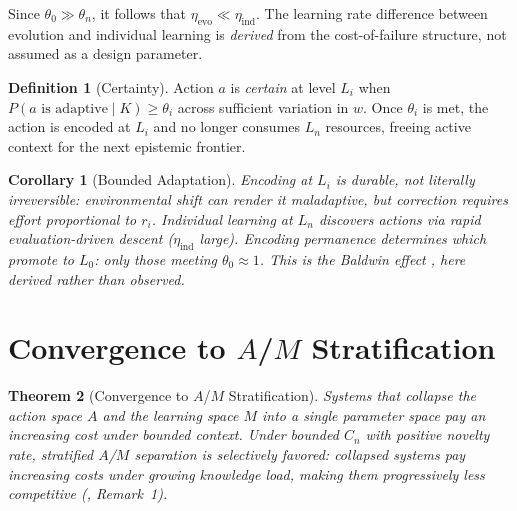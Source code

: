 \documentclass[11pt]{article}
\newtheorem{theorem}{Theorem}
\newtheorem{corollary}[theorem]{Corollary}
\theoremstyle{definition}
\newtheorem{definition}{Definition}
\theoremstyle{remark}
\begin{document}
Since $\theta_0 \gg \theta_n$, it follows that
$\eta_{\mathrm{evo}} \ll \eta_{\mathrm{ind}}$. The learning rate
difference between evolution and individual learning is \emph{derived}
from the cost-of-failure structure, not assumed as a design parameter.

\begin{definition}[Certainty]
\label{def:certain}
Action $a$ is \emph{certain} at level $L_i$ when
$P(\text{$a$ is adaptive} \mid K) \geq \theta_i$ across
sufficient variation in $w$. Once $\theta_i$ is met, the action is
encoded at $L_i$ and no longer consumes $L_n$ resources, freeing
active context for the next epistemic frontier.
\end{definition}

\begin{corollary}[Bounded Adaptation]
\label{cor:bounded}
Encoding at $L_i$ is durable, not literally irreversible:
environmental shift can render it maladaptive, but correction requires
effort proportional to $r_i$. Individual learning at $L_n$ discovers
actions via rapid evaluation-driven descent ($\eta_{\mathrm{ind}}$
large). Encoding permanence determines which promote to $L_0$: only
those meeting $\theta_0 \approx 1$. This is the Baldwin effect
\cite{Hinton1987}, here derived rather than observed.
\end{corollary}

\section{Convergence to $A$/$M$ Stratification}
\label{sec:type}

\begin{theorem}[Convergence to $A$/$M$ Stratification]
\label{thm:type}
Systems that collapse the action space $A$ and the learning space $M$
into a single parameter space pay an increasing cost under bounded
context. Under bounded $C_n$ with positive novelty rate, stratified
$A$/$M$ separation is selectively favored: collapsed systems pay
increasing costs under growing knowledge load, making them progressively less competitive
(\cite{McCarthy2026a}, Remark~1).
\end{theorem}
\end{document}
